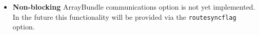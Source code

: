
\begin{itemize}

\item {\bf Non-blocking} ArrayBundle communications option is not yet implemented. In the future this functionality will be provided via the
{\tt routesyncflag} option.

\end{itemize}
